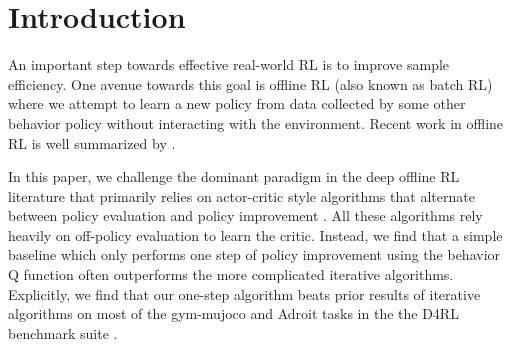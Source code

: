 \newcommand{\V}{\mathbb{V}}
\newcommand{\Prob}{\mathbb{P}}



\section{Introduction}






An important step towards effective real-world RL is to improve sample efficiency. One avenue towards this goal is offline RL (also known as batch RL) where we attempt to learn a new policy from data collected by some other behavior policy without interacting with the environment. Recent work in offline RL is well summarized by \citet{levine2020offline}.

In this paper, we challenge the dominant paradigm in the deep offline RL literature that primarily relies on actor-critic style algorithms that alternate between policy evaluation and policy improvement \citep{fujimoto2018off, fujimoto2019benchmarking, peng2019advantage, kumar2019stabilizing, kumar2020conservative, wang2020critic, wu2019behavior, kostrikov2021offline, jaques2019way, Siegel2020Keep, nachum2019algaedice}. All these algorithms rely heavily on off-policy evaluation to learn the critic. Instead, we find that a simple baseline which only performs one step of policy improvement using the behavior Q function often outperforms the more complicated iterative algorithms.
Explicitly, we find that our one-step algorithm beats prior results of iterative algorithms on most of the gym-mujoco \citep{brockman2016gym} and Adroit \citep{rajeswaran2017learning} tasks in the the D4RL benchmark suite \citep{fu2020d4rl}.

